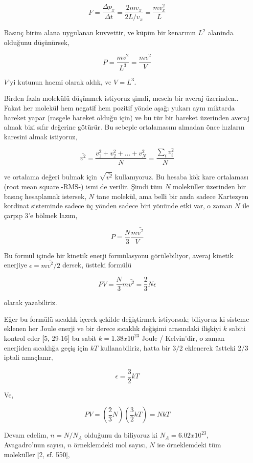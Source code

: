 \documentclass[12pt,fleqn]{article}\usepackage{../../common}
\begin{document}
$$
F = \frac{\Delta p_x}{\Delta t} = \frac{2 m v_x}{2 L / v_x} = \frac{m v_x^2}{L}
$$

Basınç birim alana uygulanan kuvvettir, ve küpün bir kenarının $L^2$ alaninda
olduğunu düşünürsek, 

$$
P = \frac{m v^2}{L^3} = \frac{m v^2}{V}
$$

$V$'yi kutunun hacmi olarak aldık, ve $V = L^3$.

Birden fazla molekülü düşünmek istiyoruz şimdi, mesela bir averaj
üzerinden.. Fakat her molekül hem negatif hem pozitif yönde aşağı yukarı aynı
miktarda hareket yapar (rasgele hareket olduğu için) ve bu tür bir hareket
üzerinden averaj almak bizi sıfır değerine götürür. Bu sebeple ortalamasını
almadan önce hızların karesini almak istiyoruz,

$$
\bar{v^2} = \frac{v_1^2 + v_2^2 + ... + v_N^2 }{N} = \frac{\sum_i v_i^2}{N}
$$

ve ortalama değeri bulmak için $\sqrt{\bar{v^2}}$ kullanıyoruz. Bu hesaba kök
kare ortalaması (root mean square -RMS-) ismi de verilir. Şimdi tüm $N$
moleküller üzerinden bir basınç hesaplamak istersek, $N$ tane molekül, ama belli
bir anda sadece Kartezyen kordinat sisteminde sadece üç yönden sadece biri
yönünde etki var, o zaman $N$ ile çarpıp 3'e bölmek lazım, 

$$
P = \frac{N}{3} \frac{m \bar{v^2}}{V}
$$

Bu formül içinde bir kinetik enerji formülasyonu görülebiliyor, averaj kinetik
enerjiye $\epsilon = m \bar{v^2} / 2$ dersek, üstteki formülü

$$
PV = \frac{N}{3} m \bar{v^2} = \frac{2}{3} N \epsilon
$$

olarak yazabiliriz.

Eğer bu formülü sıcaklık içerek şekilde değiştirmek istiyorsak; biliyoruz ki
sisteme eklenen her Joule enerji ve bir derece sıcaklık değişimi arasındaki
ilişkiyi $k$ sabiti kontrol eder [5, 29-16] bu sabit $k = 1.38 x 10^{23}$ Joule
/ Kelvin'dir, o zaman enerjiden sıcaklığa geçiş için $kT$ kullanabiliriz, hatta
bir $3/2$ eklenerek üstteki 2/3 iptali amaçlanır,

$$
\epsilon = \frac{3}{2} k T
$$

Ve,

$$
PV = \left( \frac{2}{3} N \right) \left( \frac{3}{2} k T \right) = N k T
$$

Devam edelim, $n = N / N_A$ olduğunu da biliyoruz ki $N_A = 6.02 x 10^{23}$,
Avagadro'nun sayısı, $n$ örneklemdeki mol sayısı, $N$ ise örneklemdeki tüm
moleküller [2, sf. 550],
\end{document}
